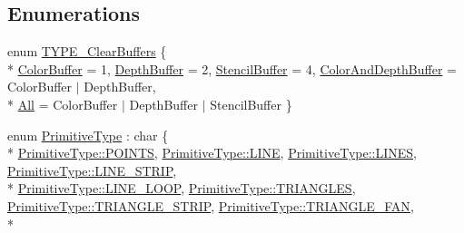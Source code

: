 \subsection*{Enumerations}
\begin{DoxyCompactItemize}
\item 
enum \hyperlink{namespace_a_c_t_k_ac45d1ac10b65556ebdc2e3651faf0ac4}{T\-Y\-P\-E\-\_\-\-Clear\-Buffers} \{ \\*
\hyperlink{namespace_a_c_t_k_ac45d1ac10b65556ebdc2e3651faf0ac4a8812187b753282c0fba74053938e05f5}{Color\-Buffer} = 1, 
\hyperlink{namespace_a_c_t_k_ac45d1ac10b65556ebdc2e3651faf0ac4a1b721cb1aae1a12ee2b4aba064d1b607}{Depth\-Buffer} = 2, 
\hyperlink{namespace_a_c_t_k_ac45d1ac10b65556ebdc2e3651faf0ac4a9769b87ecd44c48dc2096f97dfaf2147}{Stencil\-Buffer} = 4, 
\hyperlink{namespace_a_c_t_k_ac45d1ac10b65556ebdc2e3651faf0ac4a9161f8afa87135b08c8dd0473db4e8a9}{Color\-And\-Depth\-Buffer} = Color\-Buffer $|$ Depth\-Buffer, 
\\*
\hyperlink{namespace_a_c_t_k_ac45d1ac10b65556ebdc2e3651faf0ac4a4d518c1e8938e0242690845b36453d66}{All} = Color\-Buffer $|$ Depth\-Buffer $|$ Stencil\-Buffer
 \}
\item 
enum \hyperlink{namespace_a_c_t_k_ac879d5bd28581fddd1c876d2103156b8}{Primitive\-Type} \-: char \{ \\*
\hyperlink{namespace_a_c_t_k_ac879d5bd28581fddd1c876d2103156b8a70b71cabeeaf8c2bf473c896d5442ddb}{Primitive\-Type\-::\-P\-O\-I\-N\-T\-S}, 
\hyperlink{namespace_a_c_t_k_ac879d5bd28581fddd1c876d2103156b8a17b8ef2c330f1430e00c9de5469fc7e7}{Primitive\-Type\-::\-L\-I\-N\-E}, 
\hyperlink{namespace_a_c_t_k_ac879d5bd28581fddd1c876d2103156b8ae585142391f356c60bcfe68279ec2727}{Primitive\-Type\-::\-L\-I\-N\-E\-S}, 
\hyperlink{namespace_a_c_t_k_ac879d5bd28581fddd1c876d2103156b8ae64a4d2159ed46d077e21a505575c814}{Primitive\-Type\-::\-L\-I\-N\-E\-\_\-\-S\-T\-R\-I\-P}, 
\\*
\hyperlink{namespace_a_c_t_k_ac879d5bd28581fddd1c876d2103156b8a8e0df0247f66bd2cac06f16abb562134}{Primitive\-Type\-::\-L\-I\-N\-E\-\_\-\-L\-O\-O\-P}, 
\hyperlink{namespace_a_c_t_k_ac879d5bd28581fddd1c876d2103156b8add3bfee8042d1b85c224f08b42a3fc2e}{Primitive\-Type\-::\-T\-R\-I\-A\-N\-G\-L\-E\-S}, 
\hyperlink{namespace_a_c_t_k_ac879d5bd28581fddd1c876d2103156b8a708de017e3b83ccba21dfc9f6367d46f}{Primitive\-Type\-::\-T\-R\-I\-A\-N\-G\-L\-E\-\_\-\-S\-T\-R\-I\-P}, 
\hyperlink{namespace_a_c_t_k_ac879d5bd28581fddd1c876d2103156b8aa9f047dff7e4cd4d8d3bdeafc4029d47}{Primitive\-Type\-::\-T\-R\-I\-A\-N\-G\-L\-E\-\_\-\-F\-A\-N}, 
\\*

\end{DoxyCompactItemize}
